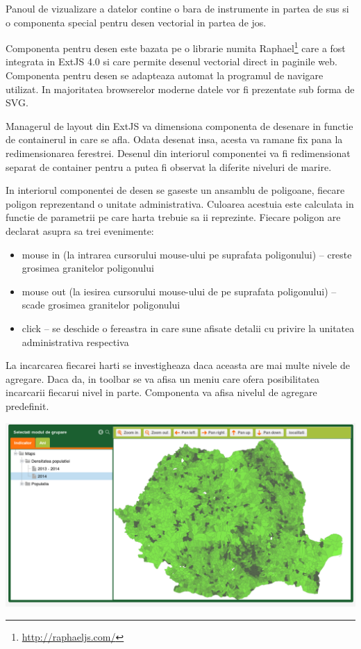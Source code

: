 \documentclass[a4paper, 10pt]{article}
\begin{document}
{Panoul de vizualizare a datelor contine o bara de instrumente in partea de sus si o componenta special pentru desen vectorial in partea de jos. 

Componenta pentru desen este bazata pe o librarie numita Raphael\footnote{\url{http://raphaeljs.com/}} care a fost integrata in ExtJS 4.0 si care permite desenul vectorial direct in paginile web. 
Componenta pentru desen se adapteaza automat la programul de navigare utilizat. In majoritatea browserelor moderne datele vor fi prezentate sub forma de SVG. 

Managerul de layout din ExtJS va dimensiona componenta de desenare in functie de containerul in care se afla. 
Odata desenat insa, acesta va ramane fix pana la redimensionarea ferestrei. 
Desenul din interiorul componentei va fi redimensionat separat de container pentru a putea fi observat la diferite niveluri de marire. 

In interiorul componentei de desen se gaseste un ansamblu de poligoane, fiecare poligon reprezentand o unitate administrativa. 
Culoarea acestuia este calculata in functie de parametrii pe care harta trebuie sa ii reprezinte. 
Fiecare poligon are declarat asupra sa trei evenimente:

\begin{itemize}
\item
mouse in (la intrarea cursorului mouse-ului pe suprafata poligonului) -- creste grosimea granitelor poligonului
\item
mouse out (la iesirea cursorului mouse-ului de pe suprafata poligonului) -- scade grosimea granitelor poligonului
\item
click -- se deschide o fereastra in care sune afisate detalii cu privire la unitatea administrativa respectiva
\end{itemize}

La incarcarea fiecarei harti se investigheaza daca aceasta are mai multe nivele de agregare. 
Daca da, in toolbar se va afisa un meniu care ofera posibilitatea incarcarii fiecarui nivel in parte. 
Componenta va afisa nivelul de agregare predefinit. 

\includegraphics[width=\textwidth]{img/geo-map}

}
\end{document}
